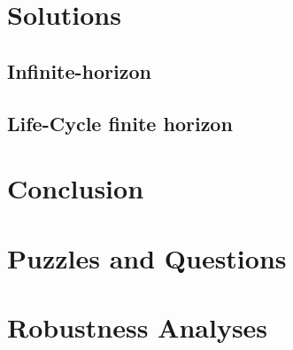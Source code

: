 \documentclass[./RiskyContrib.tex]{subfiles}
\begin{document}
\hypertarget{Solutions}{}
\section{Solutions}

\subsection{Infinite-horizon}





\subsection{Life-Cycle finite horizon}



\hypertarget{Conclusion}{}
\section{Conclusion}

\hypertarget{Puzzles-and-Questions}{}
\section{Puzzles and Questions}\label{sec:Puzzles}

\hypertarget{Robustness Analyses}{}
\section{Robustness Analyses}

\clearpage\vfill\eject

\onlyinsubfile{}
\end{document}
